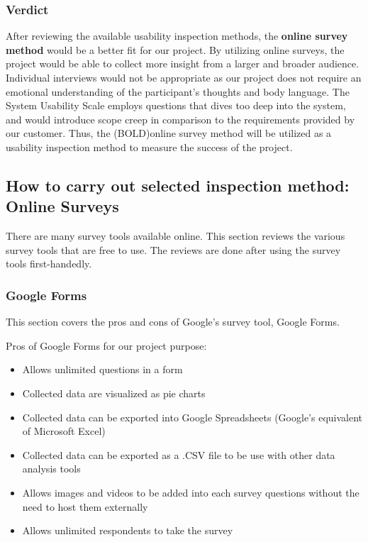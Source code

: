 \documentclass[10pt,journal,compsoc,draftclsnofoot]{IEEEtran}
\begin{document}
\subsubsection{Verdict}
After reviewing the available usability inspection methods, the \textbf{online survey method} would be a better fit for our project.
By utilizing online surveys, the project would be able to collect more insight from a larger and broader audience.
Individual interviews would not be appropriate as our project does not require an emotional understanding of the participant's thoughts and body language.
The System Usability Scale employs questions that dives too deep into the system, and would introduce scope creep in comparison to the requirements provided by our customer.
Thus, the (BOLD)online survey method will be utilized as a usability inspection method to measure the success of the project.

\newpage

\subsection{How to carry out selected inspection method: Online Surveys}
There are many survey tools available online.
This section reviews the various survey tools that are free to use.
The reviews are done after using the survey tools first-handedly.

\subsubsection{Google Forms}
This section covers the pros and cons of Google's survey tool, Google Forms.

Pros of Google Forms for our project purpose:
\begin{itemize}
\item Allows unlimited questions in a form
\item Collected data are visualized as pie charts
\item Collected data can be exported into Google Spreadsheets (Google's equivalent of Microsoft Excel)
\item Collected data can be exported as a .CSV file to be use with other data analysis tools
\item Allows images and videos to be added into each survey questions without the need to host them externally
\item Allows unlimited respondents to take the survey
\end{itemize}
\end{document}
